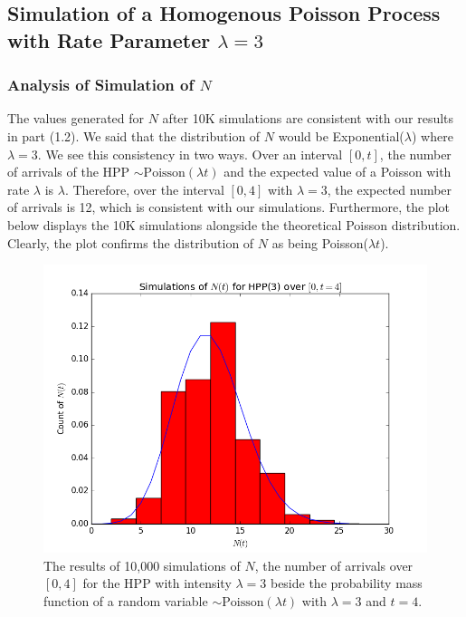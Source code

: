 \documentclass[11pt, oneside]{article}   	%
\begin{document}
\subsection{Simulation of a Homogenous Poisson Process with Rate Parameter $\lambda=3$}
\subsubsection{Analysis of Simulation of $N$}
The values generated for $N$ after 10K simulations are consistent with our results in part (1.2). We said that the distribution of $N$ would be Exponential($\lambda$) where $\lambda=3$. We see this consistency in two ways. Over an interval $[0,t]$, the number of arrivals of the HPP $\sim \text{Poisson}(\lambda t)$ and the expected value of a Poisson with rate $\lambda$ is $\lambda$. Therefore, over the interval $[0,4]$ with $\lambda=3$, the expected number of arrivals is 12, which is consistent with our simulations. Furthermore, the plot below displays the 10K simulations alongside the theoretical Poisson distribution. Clearly, the plot confirms the distribution of $N$ as being Poisson($\lambda t$). 
\begin{figure}[H]
\includegraphics[scale=.5]{hpp_nt}
\caption{The results of 10,000 simulations of $N$, the number of arrivals over $[0,4]$ for the HPP with intensity $\lambda=3$ beside the probability mass function of a random variable $\sim \text{Poisson}(\lambda t)$ with $\lambda=3$ and $t=4$.}
\label{fig:x}
\end{figure}
\end{document}
